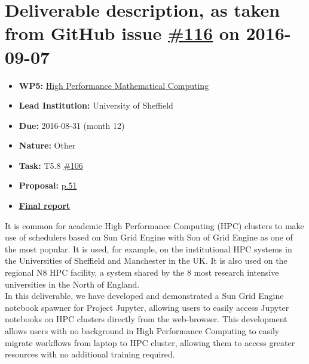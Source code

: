 \section*{\texorpdfstring{Deliverable description, as taken from GitHub
issue
\href{https://github.com/OpenDreamKit/OpenDreamKit/issues/116}{\#116} on
2016-09-07}{Deliverable description, as taken from GitHub issue \#116 on 2016-09-07}}\label{deliverable-description-as-taken-from-github-issues-116-on-2016-09-07}

\begin{itemize}
\tightlist
\item
  \textbf{WP5:}
  \href{https://github.com/OpenDreamKit/OpenDreamKit/tree/master/WP5}{High
  Performance Mathematical Computing}
\item
  \textbf{Lead Institution:} University of Sheffield
\item
  \textbf{Due:} 2016-08-31 (month 12)
\item
  \textbf{Nature:} Other
\item
  \textbf{Task:} T5.8
  \href{https://github.com/OpenDreamKit/OpenDreamKit/issues/106}{\#106}
\item
  \textbf{Proposal:}
  \href{https://github.com/OpenDreamKit/OpenDreamKit/raw/master/Proposal/proposal-www.pdf}{p.51}
\item
  \textbf{\href{https://github.com/OpenDreamKit/OpenDreamKit/raw/master/WP5/D5.3/report-final.pdf}{Final
  report}}
\end{itemize}

It is common for academic High Performance Computing (HPC) clusters to
make use of schedulers based on Sun Grid Engine with Son of Grid Engine
as one of the most popular. It is used, for example, on the
institutional HPC systems in the Universities of Sheffield and
Manchester in the UK. It is also used on the regional N8 HPC facility, a
system shared by the 8 most research intensive universities in the North
of England.\\
In this deliverable, we have developed and demonstrated a Sun Grid
Engine notebook spawner for Project Jupyter, allowing users to easily
access Jupyter notebooks on HPC clusters directly from the web-browser.
This development allows users with no background in High Performance
Computing to easily migrate workflows from laptop to HPC cluster,
allowing them to access greater resources with no additional training
required.
